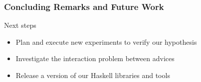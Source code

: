 \documentclass[xcolor=svgnames]{beamer}
\begin{document}
\begin{frame}
\frametitle{Concluding Remarks and Future Work}
\begin{block}{Next steps}
\begin{itemize}
  \item Plan and execute new experiments to verify our hypothesis
  \item Investigate the interaction problem between advices 
  \item Release a version of our Haskell libraries and tools
\end{itemize}
\end{block}

\end{frame}


\begin{frame}
\titlepage
\end{frame}
\end{document}

